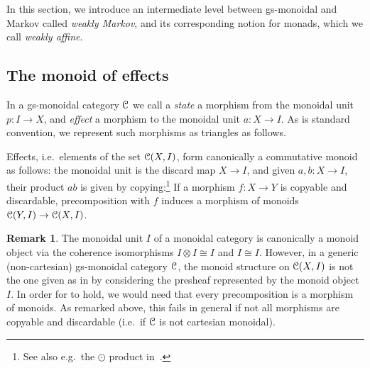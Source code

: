\documentclass[a4paper,UKenglish,numberwithinsect,cleveref, autoref, thm-restate]{lipics-v2021}
\theoremstyle{plain} %
\theoremstyle{definition} %
\newtheorem{myremark}[mytheorem]{Remark}
\begin{document}
In this section, we introduce an intermediate level between gs-monoidal and Markov called \emph{weakly Markov}, and its corresponding notion for monads, which we call \emph{weakly affine}.

\subsection{The monoid of effects}\label{monoids}

In a gs-monoidal category $\mathcal{C}$ we call a \emph{state} a morphism from the monoidal unit $p:I\to X$, and \emph{effect} a morphism to the monoidal unit $a:X\to I$.
As is standard convention, we represent such morphisms as triangles as follows.

 Effects, i.e.~elements of the set $\mathcal{C}(X,I)$, form canonically a commutative monoid as follows: the monoidal unit is the discard map $X\to I$, and given $a,b:X\to I$, their product $ab$ is given by copying:\footnote{See also e.g.~the $\odot$ product in~\cite[Proposition~3.10]{coecke2011phasegroups}.}
If a morphism $f:X\to Y$ is copyable and discardable, precomposition with $f$ induces a morphism of monoids $\mathcal{C}(Y,I)\to\mathcal{C}(X,I)$. 

\begin{myremark}
 The monoidal unit $I$ of a monoidal category is canonically a monoid object via the coherence isomorphisms $I\otimes I\cong I$ and $I\cong I$. 
 However, in a generic (non-cartesian) gs-monoidal category $\mathcal{C}$, the monoid structure on $\mathcal{C}(X,I)$ is not the one given as in  by considering the presheaf represented by the monoid object $I$. In order for  to hold, we would need that every precomposition is a morphism of monoids. As remarked above, this fails in general if not all morphisms are copyable and discardable (i.e.~if $\mathcal{C}$ is not cartesian monoidal).
\end{myremark}
\end{document}
